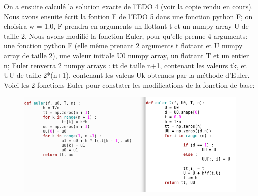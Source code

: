 \documentclass{article}
\begin{document}
$$ $$
$$ $$

On a ensuite calculé la solution exacte de l'EDO 4 (voir la copie rendu en cours). Nous avons ensuite écrit la fontion F de l'EDO 5 dans une fonction python F; on choisira w = 1.0, F prendra en arguments un flottant t et un numpy array U de taille 2.
\newline
\newline
Nous avons modifié la fonction Euler, pour qu'elle prenne 4 arguments: une fonction python F (elle même prenant 2 arguments t flottant et U numpy array de taille 2), une valeur initiale U0 numpy array, un flottant T et un entier n; Euler renverra 2 numpy arrays : tt de taille n+1, contenant les valeurs tk, et UU de taille 2*(n+1), contenant les valeus Uk obtenues par la méthode d'Euler.
\newline
\newline
Voici les 2 fonctions Euler pour constater les modifications de la fonction de base:
\newline
\begin{figure}
        \centering
        \includegraphics[width=1\textwidth]{e4.png}
\end{figure}

$$ $$
$$ $$
$$ $$
$$ $$
$$ $$
$$ $$
$$ $$
$$ $$
\end{document}
